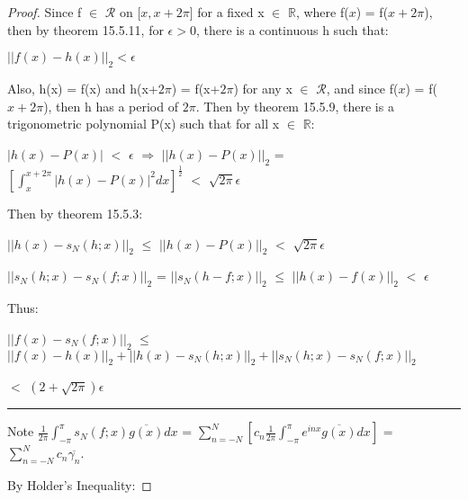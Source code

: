     \begin{proof} 
        Since f $\in$ $\mathscr{R}$ on [$x,x+2\pi$] for a fixed
        x $\in$ $\mathbb{R}$,
        where f($x$) = f($x+2\pi$), then by {\color{red} theorem 15.5.11},
        for $\epsilon > 0$, there is a continuous h such that:

        \hspace{0.5cm}
        $||f(x) - h(x)||_2 < \epsilon$

        Also, h(x) = f(x) and h(x+$2\pi$) = f(x+$2\pi$) for any x $\in$
        $\mathscr{R}$, and since f($x$) = f($x+2\pi$),
        then h has a period of $2\pi$.
        Then by {\color{red} theorem 15.5.9}, there is a trigonometric polynomial
        P(x) such that for all x $\in$ $\mathbb{R}$:

        \hspace{0.5cm}
        $|h(x) - P(x)|$ $<$ $\epsilon$
        \hspace{0.6cm}
        $\Rightarrow$
        \hspace{0.6cm}
        $||h(x) - P(x)||_2$
        = $[\int_{x}^{x+2\pi} |h(x) - P(x)|^2 dx]^{\frac{1}{2}}$
        $<$ $\sqrt{2\pi}\epsilon$

        Then by {\color{red} theorem 15.5.3}:

        \hspace{0.5cm}
        $||h(x) - s_N(h;x)||_2$
        $\leq$ $||h(x) - P(x)||_2$
        $<$ $\sqrt{2\pi}\epsilon$

        \hspace{0.5cm}
        $||s_N(h;x) - s_N(f;x)||_2$
        = $||s_N(h-f;x)||_2$
        $\leq$ $||h(x) - f(x)||_2$ $<$ $\epsilon$

        Thus:
        
        \hspace{0.5cm}
        $||f(x) - s_N(f;x)||_2$
        $\leq$ $||f(x)-h(x)||_2 + ||h(x)-s_N(h;x)||_2 + ||s_N(h;x)-s_N(f;x)||_2$
        
        \hspace{3.9cm}
        $<$ $(2+\sqrt{2\pi})\epsilon$

        \rule[0.1cm]{15.3cm}{0.01cm}

        Note
        $\frac{1}{2\pi} \int_{-\pi}^{\pi} s_N(f;x)\overline{g(x)} dx$
        = $\sum_{n=-N}^N [c_n \frac{1}{2\pi}
            \int_{-\pi}^{\pi} e^{inx}\overline{g(x)} dx]$
        = $\sum_{n=-N}^N c_n \overline{\gamma_n}$.

        By Holder's Inequality:


\end{proof}

